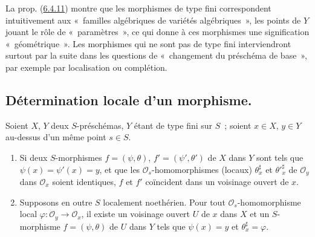 \begin{env}[6.4.13]
\label{I.6.4.13-fr}
La prop. (\hyperref[I.6.4.11-fr]{6.4.11}) montre que les morphismes de type
fini correspondent intuitivement aux «~familles algébriques de variétés
algébriques~», les points de $Y$ jouant
le rôle de «~paramètres~», ce qui donne à ces morphismes une signification
«~géométrique~». Les morphismes qui ne sont pas de type fini interviendront
surtout par la suite dans les questions de «~changement du préschéma de
base~», par exemple par localisation ou complétion.
\end{env}

\subsection{Détermination locale d'un morphisme.}
\label{subsection:I.6.5-fr}

\begin{proposition}[6.5.1]
\label{I.6.5.1-fr}
Soient $X$, $Y$ deux $S$-préschémas, $Y$ étant de type fini sur $S$~; soient
$x\in X$, $y\in Y$ au-dessus d'un même point $s\in S$.
\begin{enumerate}
  \item[(i)] Si deux $S$-morphismes $f=(\psi,\theta)$,
    $f'=(\psi',\theta')$ de $X$ dans $Y$ sont tels que
    $\psi(x)=\psi'(x)=y$, et que les $\mathscr{O}_s$-homomorphismes (locaux)
    $\theta_x^\sharp$ et ${\theta'}_x^\sharp$ de $\mathscr{O}_y$ dans
    $\mathscr{O}_x$ soient identiques, $f$ et $f'$ coïncident dans un
    voisinage ouvert de $x$.
  \item[(ii)] Supposons en outre $S$ localement noethérien. Pour tout
    $\mathscr{O}_s$-homomorphisme local
    $\varphi:\mathscr{O}_y\to\mathscr{O}_x$, il existe un voisinage ouvert
    $U$ de $x$ dans $X$ et un $S$-morphisme $f=(\psi,\theta)$ de $U$ dans $Y$
    tels que $\psi(x)=y$ et $\theta_x^\sharp=\varphi$.
\end{enumerate}
\end{proposition}

